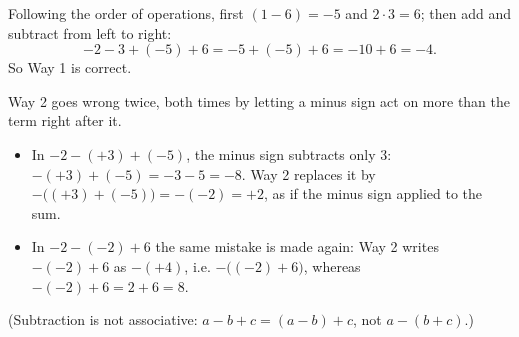 Following the order of operations, first $(1-6)=-5$ and $2\cdot3=6$; then add and subtract from left to right:
\[-2-3+(-5)+6=-5+(-5)+6=-10+6=\boxed{-4}.\]
So Way 1 is correct.

Way 2 goes wrong twice, both times by letting a minus sign act on more than the term right after it.
\begin{itemize}
\item In $-2-(+3)+(-5)$, the minus sign subtracts only $3$: $-(+3)+(-5)=-3-5=-8$. Way 2 replaces it by $-\bigl((+3)+(-5)\bigr)=-(-2)=+2$, as if the minus sign applied to the sum.
\item In $-2-(-2)+6$ the same mistake is made again: Way 2 writes $-(-2)+6$ as $-(+4)$, i.e. $-\bigl((-2)+6\bigr)$, whereas $-(-2)+6=2+6=8$.
\end{itemize}
(Subtraction is not associative: $a-b+c=(a-b)+c$, not $a-(b+c)$.)
